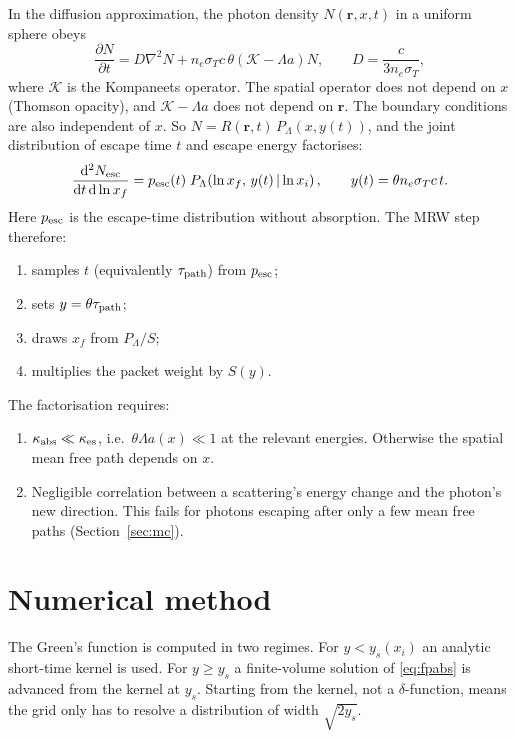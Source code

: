 \documentclass[11pt]{article}
\newcommand{\dd}{\mathrm{d}}
\begin{document}
In the diffusion approximation, the photon density $N(\mathbf r,x,t)$ in a
uniform sphere obeys
\begin{equation}
  \frac{\partial N}{\partial t} = D\nabla^2 N
  + n_e\sigma_Tc\,\theta\left(\mathcal K - \Lambda a\right)N,
  \qquad D=\frac{c}{3n_e\sigma_T},
\end{equation}
where $\mathcal K$ is the Kompaneets operator. The spatial operator does not
depend on $x$ (Thomson opacity), and $\mathcal K-\Lambda a$ does not depend
on $\mathbf r$. The boundary conditions are also independent of $x$. So
$N=R(\mathbf r,t)\,P_\Lambda(x,y(t))$, and the joint distribution of escape
time $t$ and escape energy factorises:
\begin{equation}
  \frac{\dd^2 N_{\rm esc}}{\dd t\,\dd\ln x_f} = p_{\rm esc}(t)\;
  P_\Lambda\!\left(\ln x_f,\,y(t)\,\middle|\,\ln x_i\right),
  \qquad y(t)=\theta n_e\sigma_Tc\,t .
\end{equation}
Here $p_{\rm esc}$ is the escape-time distribution without absorption. The
MRW step therefore:
\begin{enumerate}
\item samples $t$ (equivalently $\tau_{\rm path}$) from $p_{\rm esc}$;
\item sets $y=\theta\tau_{\rm path}$;
\item draws $x_f$ from $P_\Lambda/S$;
\item multiplies the packet weight by $S(y)$.
\end{enumerate}

The factorisation requires:
\begin{enumerate}
\item $\kappa_{\rm abs}\ll\kappa_{\rm es}$, i.e.\ $\theta\Lambda a(x)\ll1$
  at the relevant energies. Otherwise the spatial mean free path depends on
  $x$.
\item Negligible correlation between a scattering's energy change and the
  photon's new direction. This fails for photons escaping after only a few
  mean free paths (Section~\ref{sec:mc}).
\end{enumerate}

\section{Numerical method}\label{sec:numerics}

The Green's function is computed in two regimes. For
$y<y_s(x_i)$ an analytic short-time kernel is used. For $y\ge y_s$ a
finite-volume solution of \eqref{eq:fpabs} is advanced from the kernel at
$y_s$. Starting from the kernel, not a $\delta$-function, means the grid only
has to resolve a distribution of width $\sqrt{2y_s}$.
\end{document}
